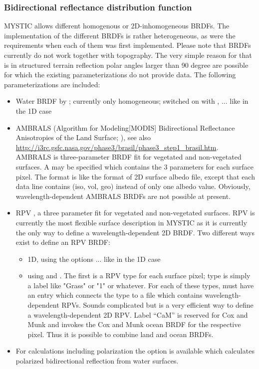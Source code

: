 {\subsubsection{Bidirectional reflectance distribution function}
MYSTIC allows different homogenous or 2D-inhomogeneous BRDFs. The 
implementation of the different BRDFs is rather heterogeneous,   
as were the requirements when each of them was first implemented.
Please note that BRDFs currently do not work together with topography. The 
very simple reason for that is in structured terrain reflection 
polar angles larger than 90 degree are possible for which the 
existing parameterizations do not provide data. The following  
parameterizations are included:
\begin{itemize}
\item Water BRDF by \citet{cox54a,cox54b}; currently only homogeneous; switched 
  on with , ... like in the 1D case
\item AMBRALS (Algorithm for Modeling[MODIS] Bidirectional Reflectance
  Anisotropies of the Land Surface; \citet{wanner97}), see also
  \url{http://i3rc.gsfc.nasa.gov/phase3/brasil/phase3_step1_brasil.htm}.
  AMBRALS is three-parameter BRDF fit for vegetated and non-vegetated surfaces.
  A  may be specified which contains the 
  3 parameters for each surface pixel. The format is like 
  the format of 2D surface albedo file, except that each data line 
  contains (iso, vol, geo) instead of only one albedo value.
  Obviously, wavelength-dependent AMBRALS BRDFs are not 
  possible at present.
\item RPV \citep{rahman93a}, a three parameter 
  fit for vegetated and non-vegetated surfaces. RPV is currently the 
  most flexible surface description in MYSTIC as it is currently 
  the only way to define a wavelength-dependent 2D BRDF. 
  Two different ways exist to define an RPV BRDF:
  \begin{itemize}
  \item 1D, using the options  ... like in the 1D case
  \item using  and .
    The first is a RPV
    type for each surface pixel; type is simply a label like 
    "Grass" or "1" or whatever. For each of these types,
     must have an entry which connects the type to
    a file which contains wavelength-dependent RPVs. Sounds
    complicated but is a very efficient way to define a
    wavelength-dependent 2D RPV. Label ``CaM'' is reserved for Cox and Munk 
    and invokes the Cox and Munk ocean BRDF for the respective pixel. Thus
    it is possible to combine land and ocean BRDFs.
  \end{itemize}
\item For calculations including polarization the option
   is available which calculates polarized
  bidirectional reflection from water surfaces. 
\end{itemize}
}

